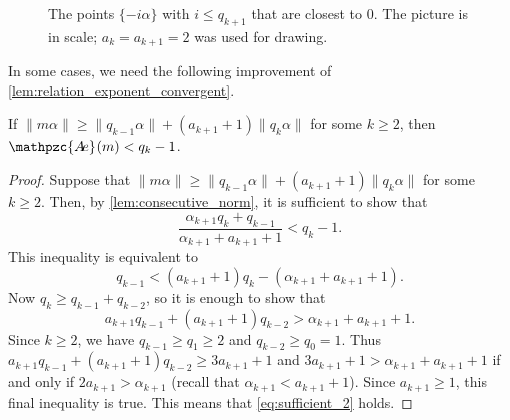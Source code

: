 \documentclass[a4paper,fleqn]{article}
\providecommand{\norm}[1]{\lVert#1\rVert}
\newcommand{\abexp}[2][]{\mathpzc{A\mkern-3mu e}_{#1}(#2)}
\begin{document}
\begin{figure}
  \caption{The points $\{-i\alpha\}$ with $i \leq q_{k+1}$ that are closest to $0$. The picture is in scale;
  $a_k = a_{k+1} = 2$ was used for drawing.}
  \label{fig:intervals}
  \end{figure}

  In some cases, we need the following improvement of \autoref{lem:relation_exponent_convergent}.

  \begin{lemma}\label{lem:relation_exponent_convergent_2}
    If $\norm{m\alpha} \geq \norm{q_{k-1}\alpha} + (a_{k+1} + 1)\norm{q_k\alpha}$ for some $k \geq 2$, then
    $\abexp{m} < q_k - 1$.
  \end{lemma}
  \begin{proof}
    Suppose that $\norm{m\alpha} \geq \norm{q_{k-1}\alpha} + (a_{k+1} + 1)\norm{q_k\alpha}$ for some $k \geq 2$. Then,
    by \autoref{lem:consecutive_norm}, it is sufficient to show that
    \begin{equation*}
      \frac{\alpha_{k+1}q_k + q_{k-1}}{\alpha_{k+1} + a_{k+1} + 1} < q_k - 1.
    \end{equation*}
    This inequality is equivalent to
    \begin{equation}\label{eq:foo3}
      q_{k-1} < (a_{k+1} + 1)q_k - (\alpha_{k+1} + a_{k+1} + 1).
    \end{equation}
    Now $q_k \geq q_{k-1} + q_{k-2}$, so it is enough to show that
    \begin{equation}\label{eq:sufficient_2}
      a_{k+1}q_{k-1} + (a_{k+1} + 1)q_{k-2} > \alpha_{k+1} + a_{k+1} + 1.
    \end{equation}
    Since $k \geq 2$, we have $q_{k-1} \geq q_1 \geq 2$ and $q_{k-2} \geq q_0 = 1$. Thus
    $a_{k+1}q_{k-1} + (a_{k+1} + 1)q_{k-2} \geq 3a_{k+1} + 1$ and $3a_{k+1} + 1 > \alpha_{k+1} + a_{k+1} + 1$ if and
    only if $2a_{k+1} > \alpha_{k+1}$ (recall that $\alpha_{k+1} < a_{k+1} + 1$). Since $a_{k+1} \geq 1$, this final
    inequality is true. This means that \eqref{eq:sufficient_2} holds.
  \end{proof}
\end{document}

